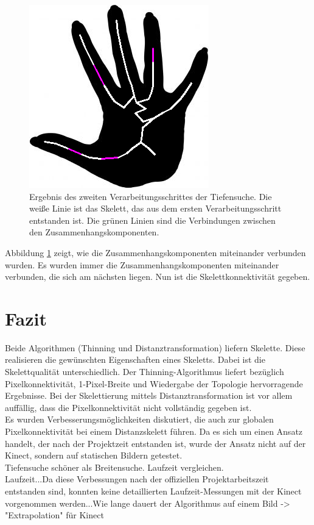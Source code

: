 \begin{figure}[h!]
\centering
\includegraphics[width=0.4\linewidth]{./fig/dfs-endergebnis-hand2.png}
\caption{Ergebnis des zweiten Verarbeitungsschrittes der Tiefensuche. Die weiße Linie ist das Skelett,
das aus dem ersten Verarbeitungsschritt entstanden ist. Die grünen
Linien sind die Verbindungen zwischen den Zusammenhangskomponenten.}
\label{fig:hand-DFS-endergebnis}
\end{figure}
Abbildung \ref{fig:hand-DFS-endergebnis} zeigt, wie die Zusammenhangskomponenten miteinander verbunden
wurden. Es wurden immer die Zusammenhangskomponenten miteinander verbunden, die sich am nächsten liegen.
Nun ist die Skelettkonnektivität gegeben.
\section{Fazit}
Beide Algorithmen (Thinning und Distanztransformation) liefern 
Skelette. Diese realisieren die gewünschten Eigenschaften eines
Skeletts. Dabei ist die Skelettqualität unterschiedlich. Der
Thinning-Algorithmus liefert bezüglich Pixelkonnektivität, 
1-Pixel-Breite und Wiedergabe der Topologie hervorragende Ergebnisse. Bei der Skelettierung mittels Distanztransformation
ist vor allem auffällig, dass die Pixelkonnektivität nicht vollständig gegeben ist. \\
Es wurden Verbesserungsmöglichkeiten diskutiert, die auch zur globalen Pixelkonnektivität bei einem Distanzskelett führen. 
Da es sich um einen Ansatz handelt, der nach der Projektzeit 
entstanden ist, wurde der Ansatz nicht auf der Kinect, sondern auf
statischen Bildern getestet. \\
Tiefensuche schöner als Breitensuche. Laufzeit vergleichen.\\
Laufzeit...Da diese Verbessungen nach der offiziellen Projektarbeitszeit 
entstanden sind, konnten keine detaillierten Laufzeit-Messungen mit der Kinect vorgenommen werden...Wie lange dauert der Algorithmus auf einem Bild -> "Extrapolation" für Kinect\\
